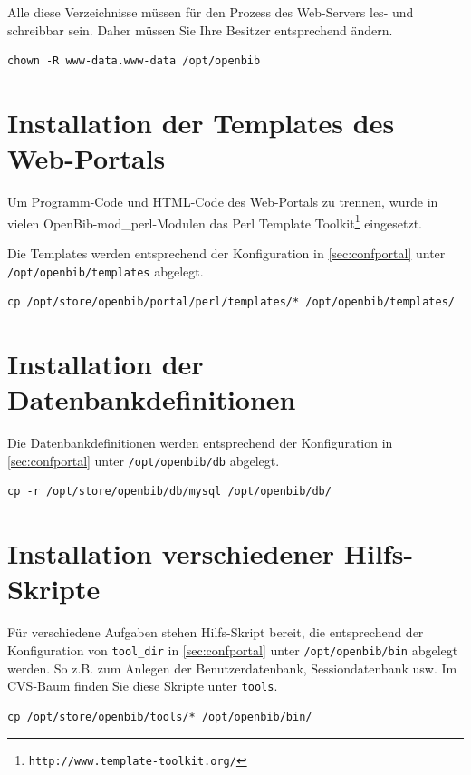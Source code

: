 \documentclass[11pt, twoside, a4paper, BCOR8mm, DIV12, bibtotoc,idxtotoc]{scrbook}
\begin{document}
Alle diese Verzeichnisse müssen für den Prozess des Web-Servers
les- und schreibbar sein. Daher müssen Sie Ihre Besitzer entsprechend
ändern.

\begin{verbatim}
chown -R www-data.www-data /opt/openbib
\end{verbatim}

\section{Installation der Templates des Web-Portals}

Um Programm-Code und HTML-Code des Web-Portals zu trennen, wurde in
vielen OpenBib-mod\_perl-Modulen das Perl Template
Toolkit\footnote{\texttt{http://www.template-toolkit.org/}}
eingesetzt.

Die Templates werden entsprechend der Konfiguration in
\ref{sec:confportal} unter \texttt{/opt/openbib/templates} abgelegt.

\begin{verbatim}
cp /opt/store/openbib/portal/perl/templates/* /opt/openbib/templates/
\end{verbatim}

\section{Installation der Datenbankdefinitionen}

Die Datenbankdefinitionen werden entsprechend der Konfiguration in
\ref{sec:confportal} unter \texttt{/opt/openbib/db} abgelegt.

\begin{verbatim}
cp -r /opt/store/openbib/db/mysql /opt/openbib/db/
\end{verbatim}

\section{Installation verschiedener Hilfs-Skripte}

Für verschiedene Aufgaben stehen Hilfs-Skript bereit, die
entsprechend der Konfiguration von \texttt{tool\_dir} in
\ref{sec:confportal} unter \texttt{/opt/openbib/bin} abgelegt werden.
So z.B. zum Anlegen der Benutzerdatenbank, Sessiondatenbank usw. Im
CVS-Baum finden Sie diese Skripte unter \texttt{tools}.

\begin{verbatim}
cp /opt/store/openbib/tools/* /opt/openbib/bin/
\end{verbatim}
\end{document}
